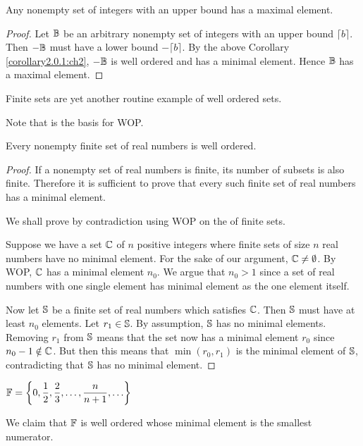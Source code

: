 \begin{cor}
    Any nonempty set of integers with an upper bound has a maximal element.
\end{cor}

\begin{proof} \label{corollary2.0.2:ch2}
    Let $\mathbb{B}$ be an arbitrary nonempty set of integers with an upper
    bound $\lceil b \rceil$. Then $-\mathbb{B}$ must have a lower bound $-\lceil b \rceil$.
    By the above Corollary \ref{corollary2.0.1:ch2}, $-\mathbb{B}$ is well ordered and has
    a minimal element. Hence $\mathbb{B}$ has a maximal element.
\end{proof}

Finite sets are yet another routine example of well ordered sets.

\begin{ab}
    Note that  is the basis for WOP.
\end{ab}

\begin{lemNotes}
    Every nonempty finite set of real numbers is well ordered.
\end{lemNotes}

\begin{proof}
    If a nonempty set of real numbers is finite, its number of subsets is also finite.
    Therefore it is sufficient to prove that every such finite set of real numbers has a minimal element.

    We shall prove by contradiction using WOP on the  of finite sets.

    Suppose we have a set $\mathbb{C}$ of $n$ positive integers where finite
    sets of size $n$ real numbers have no minimal element. For the sake of our argument,
    $\mathbb{C} \neq \emptyset$. By WOP, $\mathbb{C}$ has a minimal element $n_0$. We argue
    that $n_0 > 1$ since a set of real numbers with one single element has
    minimal element as the one element itself.

    Now let $\mathbb{S}$ be a finite set of real numbers which satisfies
    $\mathbb{C}$. Then $\mathbb{S}$ must have at least $n_0$ elements. Let $r_1 \in \mathbb{S}$.
    By assumption, $\mathbb{S}$ has no minimal elements. Removing $r_1$ from $\mathbb{S}$
    means that the set now has a minimal element $r_0$ since $n_0 - 1 \notin \mathbb{C}$.
    But then this means that $\min(r_0, r_1)$ is the minimal element of $\mathbb{S}$,
    contradicting that $\mathbb{S}$ has no minimal element.
\end{proof}

$\mathbb{F} = \left\{ 0, \dfrac{1}{2}, \dfrac{2}{3}, \ldots, \dfrac{n}{n + 1}, \ldots \right\}$

We claim that $\mathbb{F}$ is well ordered whose minimal element is the smallest
numerator.